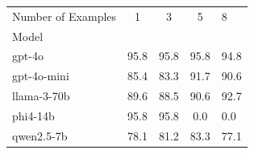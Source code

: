 \begin{table}
\label{tab:batch_3.0_stats}
\begin{tabular}{lccc}
\toprule
Number of Examples & 1 & 3 & 5 & 8 \\
Model &  &  &  &  \\
\midrule
gpt-4o & 95.8 & 95.8 & 95.8 & 94.8 \\
gpt-4o-mini & 85.4 & 83.3 & 91.7 & 90.6 \\
llama-3-70b & 89.6 & 88.5 & 90.6 & 92.7 \\
phi4-14b & 95.8 & 95.8 & 0.0 & 0.0 \\
qwen2.5-7b & 78.1 & 81.2 & 83.3 & 77.1 \\
\bottomrule
\end{tabular}
\end{table}
